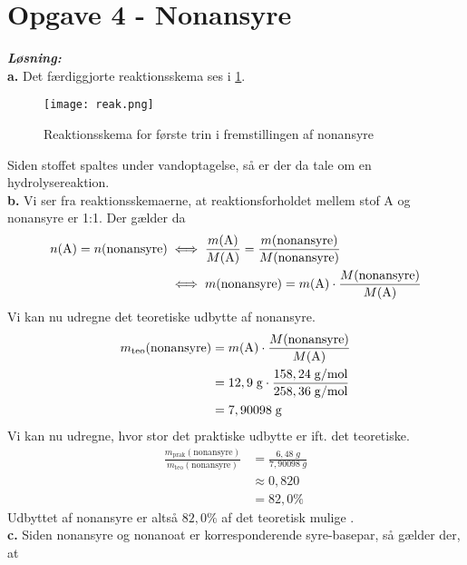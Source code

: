 \documentclass{report}
\newcommand{\sol}{\setlength{\parindent}{0cm}\textbf{\textit{Løsning:}}\setlength{\parindent}{1cm}}
\begin{document}
\section*{Opgave 4 - Nonansyre}
\sol \\
\textbf{a.}
Det færdiggjorte reaktionsskema ses i \cref{fig:reak}.
\begin{figure}[H]
\begin{center}
  \texttt{[image: reak.png]}
\end{center}
\caption{Reaktionsskema for første trin i fremstillingen af nonansyre}
\label{fig:reak}
\end{figure}
Siden stoffet spaltes under vandoptagelse, så er der da tale om en hydrolysereaktion. \\[1ex]
\textbf{b.}
Vi ser fra reaktionsskemaerne, at reaktionsforholdet mellem stof A og nonansyre er 1:1.
Der gælder da 
\begin{equation*}
\begin{split}
  n(\ce{A} )=n(\text{nonansyre} ) &\iff \frac{m(\ce{A} )}{M(\ce{A} )}=\frac{m(\text{nonansyre} )}{M(\text{nonansyre} )}\\
  &\iff m(\text{nonansyre} )=m(\ce{A} ) \cdot \frac{M(\text{nonansyre} )}{M(\ce{A} )}
\end{split}
\end{equation*}
Vi kan nu udregne det teoretiske udbytte af nonansyre.
\begin{equation*}
\begin{split}
  m_{\text{teo} }(\text{nonansyre} )&=m(\ce{A} ) \cdot \frac{M(\text{nonansyre} )}{M(\ce{A} )}\\
  &=12,9 \;\unit{g} \cdot \frac{158,24 \;\unit{g/mol} }{258,36 \;\unit{g/mol} }\\
  &=7,90098 \;\unit{g} 
\end{split}
\end{equation*}
Vi kan nu udregne, hvor stor det praktiske udbytte er ift. det teoretiske.
\begin{equation*}
\begin{split}
  \frac{m_{\text{prak} }(\text{nonansyre} )}{m_{\text{teo} }(\text{nonansyre} )}&=\frac{6,48 \;\unit{g} }{7,90098 \;\unit{g} }\\
  &\approx 0,820 \\
  &=82,0 \%
\end{split}
\end{equation*}
Udbyttet af nonansyre er altså $82,0 \%$ af det teoretisk mulige .
\\[1ex]
\textbf{c.}
Siden nonansyre og nonanoat er korresponderende syre-basepar, så gælder der, at 
\end{document}
